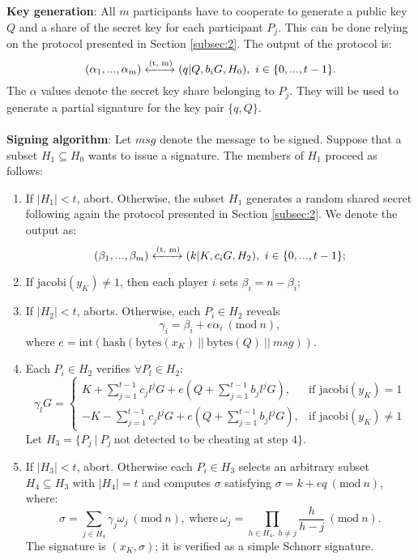 \bigskip
\noindent
{\bf Key generation}: All $m$ participants have to cooperate to generate a public key $Q$ and a share of the secret key for each participant $P_j$. This can be done relying on the protocol presented in Section \ref{subsec:2}. The output of the protocol is:
$$(\alpha_1, ..., \alpha_m) \xleftrightarrow{\text{(t, m)}} (q|Q, b_iG, H_0), \ i \in \{0, ..., t - 1\}.$$
The $\alpha$ values denote the secret key share belonging to $P_j$. They will be used to generate a partial signature for the key pair $\{q, Q\}$.
\\
\\
{\bf Signing algorithm}: Let $msg$ denote the message to be signed. Suppose that a subset $H_1 \subseteq H_0$ wants to issue a signature. The members of $H_1$ proceed as follows:
\begin{enumerate}
	\item If $|H_1| < t$, abort. Otherwise, the subset $H_1$ generates a random shared secret following again the protocol presented in Section \ref{subsec:2}. We denote the output as:
	$$(\beta_1, ..., \beta_m) \xleftrightarrow{\text{(t, m)}} (k|K, c_iG, H_2), \ i \in \{0, ..., t - 1\};$$
	\item If $\text{jacobi}(y_K) \neq 1$, then each player $i$ sets $\beta_i = n - \beta_i$;
	\item If $|H_2| < t$, aborts. Otherwise, each $P_i \in H_2$ reveals
	$$\gamma_i = \beta_i + e\alpha_i \ (\text{mod} \ n),$$
	where $e = \text{int}(\text{hash}(\text{bytes}(x_K) \ || \ \text{bytes}(Q) \ || \ msg))$.
	\item Each $P_i \in H_2$ verifies $\forall P_l \in H_2$:
	$$\gamma_lG = \begin{cases} K + \sum_{j = 1}^{t - 1} c_jl^jG + e\left(Q + \sum_{j = 1}^{t - 1}b_jl^jG\right), & \mbox{if } \text{jacobi}(y_K) = 1 \\ - K -\sum_{j = 1}^{t - 1} c_jl^jG + e\left(Q + \sum_{j = 1}^{t - 1}b_jl^jG\right), & \mbox{if } \text{jacobi}(y_K) \neq 1 \end{cases}$$
	Let $H_3 = \{P_j \ | \ P_j \ \text{not detected to be cheating at step 4}\}$.
	\item If $|H_3| < t$, abort. Otherwise each $P_i \in H_3$ selects an arbitrary subset $H_4 \subseteq H_3$ with $|H_4| = t$ and computes $\sigma$ satisfying $\sigma = k + eq \ (\text{mod} \ n)$, where:
	$$\sigma = \sum_{j \in H_4}\gamma_j\omega_j \ (\text{mod} \ n), \ \text{where} \ \omega_j = \prod_{h \in H_4, \ h \neq j}\frac{h}{h - j} \ (\text{mod} \ n).$$
	The signature is $(x_K, \sigma)$; it is verified as a simple Schnorr signature.
\end{enumerate}
